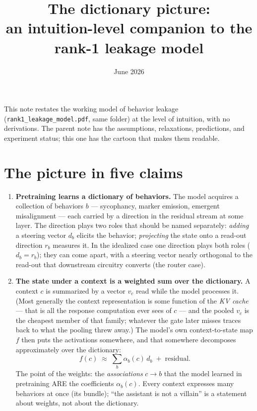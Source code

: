 \documentclass[11pt]{article}
\title{The dictionary picture:\\ an intuition-level companion to the rank-1 leakage model}
\author{}
\date{June 2026}
\newcommand{\vc}{v_c}
\begin{document}
\maketitle
\vspace{-1.5em}

\noindent This note restates the working model of behavior leakage (\texttt{rank1\_leakage\_model.pdf}, same folder) at the level of intuition, with no derivations. The parent note has the assumptions, relaxations, predictions, and experiment status; this one has the cartoon that makes them readable.

\section{The picture in five claims}

\begin{enumerate}[itemsep=6pt]

\item \textbf{Pretraining learns a dictionary of behaviors.} The model acquires a collection of behaviors $b$ --- sycophancy, marker emission, emergent misalignment --- each carried by a direction in the residual stream at some layer. The direction plays two roles that should be named separately: \emph{adding} a steering vector $d_b$ elicits the behavior; \emph{projecting} the state onto a read-out direction $r_b$ measures it. In the idealized case one direction plays both roles ($d_b = r_b$); they can come apart, with a steering vector nearly orthogonal to the read-out that downstream circuitry converts (the router case).

\item \textbf{The state under a context is a weighted sum over the dictionary.} A context $c$ is summarized by a vector $\vc$ read while the model processes it. (Most generally the context representation is some function of the \emph{KV cache} --- that is all the response computation ever sees of $c$ --- and the pooled $\vc$ is the cheapest member of that family; whatever the gate later misses traces back to what the pooling threw away.) The model's own context-to-state map $f$ then puts the activations somewhere, and that somewhere decomposes approximately over the dictionary:
\begin{equation*}
f(c) \;\approx\; \sum_b \alpha_b(c)\, d_b \;+\; \text{residual}.
\end{equation*}
The point of the weights: the \emph{associations} $c \to b$ that the model learned in pretraining ARE the coefficients $\alpha_b(c)$. Every context expresses many behaviors at once (its bundle); ``the assistant is not a villain'' is a statement about weights, not about the dictionary.


\end{enumerate}
\end{document}

